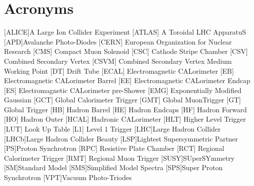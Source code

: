 



\newpage
\section*{Acronyms}

\begin{acronym}[AAAAAAA]
[ALICE]{A Large Ion Collider Experiment}
 [ATLAS] {A Toroidal LHC ApparatuS}
[APD]{Avalanche Photo-Diodes}
 [CERN] {European Organization for Nuclear Research}
 [CMS] {Compact Muon Solenoid}
 [CSC] {Cathode Stripe Chamber}
 [CSV] {Combined Secondary Vertex}
 [CSVM] {Combined Secondary Vertex Medium Working Point}
 [DT] {Drift Tube}
 [ECAL] {Electromagnetic CALorimeter}
 [EB] {Electromagnetic CALorimeter Barrel}
 [EE] {Electromagnetic CALorimeter Endcap}
 [ES] {Electromagnetic CALorimeter pre-Shower}
 [EMG] {Exponentially Modified Gaussian}
 [GCT] {Global Calorimeter Trigger}
 [GMT] {Global MuonTrigger}
 [GT] {Global Trigger}
 [HB] {Hadron Barrel}
 [HE] {Hadron Endcaps}
 [HF] {Hadron Forward}
 [HO] {Hadron Outer}
 [HCAL] {Hadronic CALorimeter}
[HLT] {Higher Level Trigger}
 [LUT] {Look Up Table}
 [L1] {Level 1 Trigger}
[LHC]{Large Hadron Collider}
[LHCb]{Large Hadron Collider Beauty}
[LSP]{Lightest Supersymmetric Partner}
[PS]{Proton Synchrotron}
 [RPC] {Resistive Plate Chamber}
 [RCT] {Regional Calorimeter Trigger}
 [RMT] {Regional Muon Trigger}
[SUSY]{SUperSYmmetry}
[SM]{Standard Model}
[SMS]{Simplified Model Spectra}
[SPS]{Super Proton Synchrotron}
[VPT]{Vacuum Photo-Triodes}

\end{acronym}


\listoffigures
\listoftables
